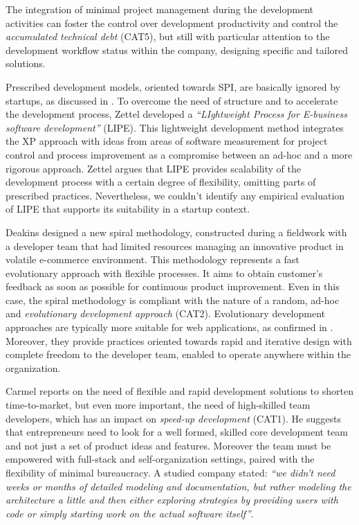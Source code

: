\documentclass[10pt,journal,letterpaper,compsoc]{IEEEtran}
\begin{document}
The integration of minimal project management during the development activities 
can foster the control over development productivity and control the 
\textit{accumulated technical debt} (CAT5), but still with particular attention 
to the development workflow status within the company, designing specific and 
tailored solutions. 

Prescribed development models, oriented towards SPI, are basically ignored by 
startups, as discussed in \cite{Zettel2001}. 
To overcome the need of structure and to accelerate the development process, 
Zettel developed a \textit{``LIghtweight Process for E-business software 
development''} (LIPE). This lightweight development method integrates the XP 
approach with ideas from areas of software measurement for project control and 
process improvement as a compromise between an ad-hoc and a more rigorous 
approach. Zettel argues that LIPE provides scalability of the development 
process with a certain degree of flexibility, omitting parts of prescribed 
practices. Nevertheless, we couldn't identify any empirical evaluation of LIPE 
that supports its suitability in a startup context.


Deakins \cite{Deakins2005} designed a new spiral methodology, constructed  
during a fieldwork with a developer team that had limited resources managing an 
innovative product in volatile e-commerce environment. This methodology 
represents a fast evolutionary approach with flexible processes. 
It aims to obtain customer's feedback as soon as possible for continuous 
product improvement.%
Even in this case, the spiral methodology%
is compliant with the nature of a random, ad-hoc and  \textit{evolutionary 
development approach} (CAT2). Evolutionary development approaches are 
typically more suitable for web applications, as confirmed in 
\cite{Deshpande2001}.
Moreover, they provide practices oriented towards rapid and iterative design 
with complete freedom to the developer team, enabled to operate anywhere within 
the organization.

Carmel \cite{Camel1994a} reports on the need of flexible and rapid development 
solutions to shorten time-to-market, but even more important, the need of 
high-skilled team developers, which has an impact on \textit{speed-up 
development} (CAT1). He suggests that entrepreneurs need to look for a well 
formed, skilled core development team and not just a set of product ideas and 
features. Moreover the team must be empowered with full-stack and 
self-organization settings, paired with the flexibility of minimal bureaucracy. 
A studied company stated: \textit{``we didn't need weeks or months of detailed 
modeling and documentation, but rather modeling the architecture a little and 
then either exploring strategies by providing users with code or simply starting 
work on the actual software itself''}.
\end{document}
